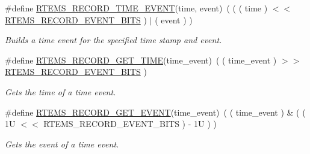 \begin{DoxyCompactItemize}
\#define \mbox{\hyperlink{group__RTEMSRecord_ga1aeb8cd2e899b3db6889622dfebd8891}{R\+T\+E\+M\+S\+\_\+\+R\+E\+C\+O\+R\+D\+\_\+\+T\+I\+M\+E\+\_\+\+E\+V\+E\+NT}}(time,  event)~( ( ( time ) $<$$<$ \mbox{\hyperlink{group__RTEMSRecord_gabcfd0807c7a68e7c378e9f3c3c08b296}{R\+T\+E\+M\+S\+\_\+\+R\+E\+C\+O\+R\+D\+\_\+\+E\+V\+E\+N\+T\+\_\+\+B\+I\+TS}} ) $\vert$ ( event ) )
\begin{DoxyCompactList}\small\item\em Builds a time event for the specified time stamp and event. \end{DoxyCompactList}\item 
\mbox{\label{group__RTEMSRecord_ga94c006eed29be181af471df896782ee8}} 
\#define \mbox{\hyperlink{group__RTEMSRecord_ga94c006eed29be181af471df896782ee8}{R\+T\+E\+M\+S\+\_\+\+R\+E\+C\+O\+R\+D\+\_\+\+G\+E\+T\+\_\+\+T\+I\+ME}}(time\+\_\+event)~( ( time\+\_\+event ) $>$$>$ \mbox{\hyperlink{group__RTEMSRecord_gabcfd0807c7a68e7c378e9f3c3c08b296}{R\+T\+E\+M\+S\+\_\+\+R\+E\+C\+O\+R\+D\+\_\+\+E\+V\+E\+N\+T\+\_\+\+B\+I\+TS}} )
\begin{DoxyCompactList}\small\item\em Gets the time of a time event. \end{DoxyCompactList}\item 
\mbox{\label{group__RTEMSRecord_gaa629d1b76a17dc348c8a9480fa0fd4e4}} 
\#define \mbox{\hyperlink{group__RTEMSRecord_gaa629d1b76a17dc348c8a9480fa0fd4e4}{R\+T\+E\+M\+S\+\_\+\+R\+E\+C\+O\+R\+D\+\_\+\+G\+E\+T\+\_\+\+E\+V\+E\+NT}}(time\+\_\+event)~( ( time\+\_\+event ) \& ( ( 1\+U $<$$<$ R\+T\+E\+M\+S\+\_\+\+R\+E\+C\+O\+R\+D\+\_\+\+E\+V\+E\+N\+T\+\_\+\+B\+I\+T\+S ) -\/ 1\+U ) )
\begin{DoxyCompactList}\small\item\em Gets the event of a time event. \end{DoxyCompactList}\end{DoxyCompactItemize}
